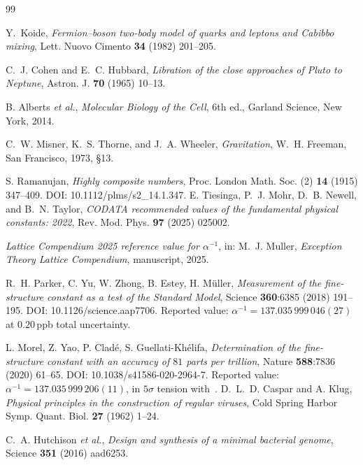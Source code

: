 \documentclass[11pt,a4paper]{article}
\theoremstyle{definition}
\theoremstyle{remark}
\begin{document}
\begin{thebibliography}{99}

Y.~Koide,
\emph{Fermion--boson two-body model of quarks and leptons and Cabibbo mixing},
Lett. Nuovo Cimento {\bf 34} (1982) 201--205.

C.~J. Cohen and E.~C. Hubbard,
\emph{Libration of the close approaches of Pluto to Neptune},
Astron. J. {\bf 70} (1965) 10--13.

B. Alberts \emph{et al.},
\emph{Molecular Biology of the Cell}, 6th ed., Garland Science, New York, 2014.

C.~W. Misner, K.~S. Thorne, and J.~A. Wheeler,
\emph{Gravitation}, W.~H. Freeman, San Francisco, 1973, \S 13.


S. Ramanujan,
\emph{Highly composite numbers},
Proc. London Math. Soc. (2) {\bf 14} (1915) 347--409.
DOI: 10.1112/plms/s2\_14.1.347.
E. Tiesinga, P.~J. Mohr, D.~B. Newell, and B.~N. Taylor,
\emph{CODATA recommended values of the fundamental physical constants: 2022},
Rev. Mod. Phys. {\bf 97} (2025) 025002.

\emph{Lattice Compendium 2025 reference value for $\alpha^{-1}$}, in: M.~J. Muller, \emph{Exception Theory Lattice Compendium}, manuscript, 2025.


R.~H. Parker, C. Yu, W. Zhong, B. Estey, H. M\"uller,
\emph{Measurement of the fine-structure constant as a test of the Standard Model},
Science {\bf 360}:6385 (2018) 191--195.
DOI: 10.1126/science.aap7706.
Reported value: $\alpha^{-1} = 137.035\,999\,046(27)$ at $0.20$\,ppb total uncertainty.

L. Morel, Z. Yao, P. Clad\'e, S. Guellati-Kh\'elifa,
\emph{Determination of the fine-structure constant with an accuracy of $81$ parts per trillion},
Nature {\bf 588}:7836 (2020) 61--65.
DOI: 10.1038/s41586-020-2964-7.
Reported value: $\alpha^{-1} = 137.035\,999\,206(11)$, in $5\sigma$ tension with~\cite{Parker2018}.
D.~L.~D. Caspar and A. Klug,
\emph{Physical principles in the construction of regular viruses},
Cold Spring Harbor Symp. Quant. Biol. {\bf 27} (1962) 1--24.

C.~A. Hutchison \emph{et al.},
\emph{Design and synthesis of a minimal bacterial genome},
Science {\bf 351} (2016) aad6253.


\end{thebibliography}
\end{document}
